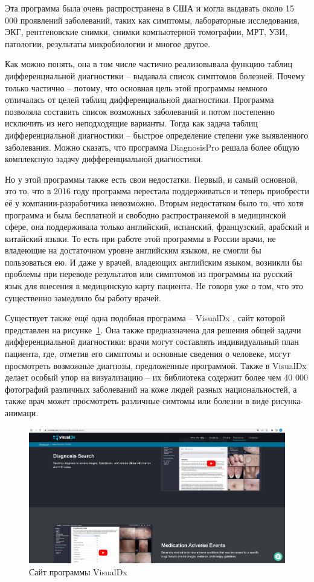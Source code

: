 Эта программа была очень распространена в США и могла выдавать около 15 000 проявлений заболеваний, таких как симптомы, лабораторные исследования, ЭКГ, рентгеновские снимки, снимки компьютерной томографии, МРТ, УЗИ, патологии, результаты микробиологии и многое другое. 

Как можно понять, она в том числе частично реализовывала функцию таблиц дифференциальной диагностики -- выдавала список симптомов болезней. Почему только частично -- потому, что основная цель этой программы немного отличалась от целей таблиц дифференциальной диагностики. Программа позволяла составить список возможных заболеваний и потом постепенно исключить из него неподходящие варианты. Тогда как задача таблиц дифференциальной диагностики -- быстрое определение степени уже выявленного заболевания. Можно сказать, что программа DiagnosisPro решала более общую комплексную задачу дифференциальной диагностики. 

Но у этой программы также есть свои недостатки. Первый, и самый основной, это то, что в 2016 году программа перестала поддерживаться и теперь приобрести её у компании-разработчика невозможно. Вторым недостатком было то, что хотя программа и была бесплатной и свободно распространяемой в медицинской сфере, она поддерживала только английский, испанский, французский, арабский и китайский языки. То есть при работе этой программы в России врачи, не владеющие на достаточном уровне английским языком, не смогли бы пользоваться ею. И даже у врачей, владеющих английским языком, возникли бы проблемы при переводе результатов или симптомов из программы на русский язык для внесения в медицинскую карту пациента. Не говоря уже о том, что это существенно замедлило бы работу врачей.

Существует также ещё одна подобная программа -- VisualDx \cite{visualdx}, сайт которой представлен на рисунке~\ref{fig:vdx}. Она также предназначена для решения общей задачи дифференциальной диагностики: врачи могут составлять индивидуальный план пациента, где, отметив его симптомы и основные сведения о человеке, могут просмотреть возможные диагнозы, предложенные программой. Также в VisualDx делает особый упор на визуализацию -- их библиотека содержит более чем 40 000 фотографий различных заболеваний на коже людей разных национальностей, а также врач может просмотреть различные симтомы или болезни в виде рисунка-анимаци.

\begin{figure}
  \includegraphics[scale=0.3]{src/VisDx.png}
  \caption{Сайт программы VisualDx}
  \label{fig:vdx}
\end{figure}

